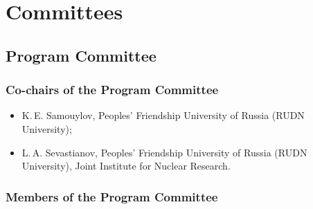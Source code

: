 \chapter*{Committees}


\section*{Program Committee}

\subsection*{Co-chairs of the Program Committee}

\begin{itemize}
\item K.\,E. Samouylov, Peoples’ Friendship University of Russia (RUDN
  University);
\item L.\,A. Sevastianov, Peoples’ Friendship University of Russia
  (RUDN University), Joint Institute for Nuclear Research.
\end{itemize}

\subsection*{Members of the Program Committee}

